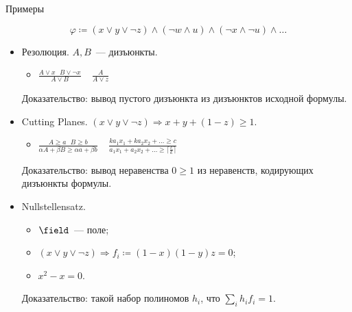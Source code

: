 \begin{frame}{Примеры}

    $$
        \varphi \coloneqq (x \lor y \lor \neg z) \land (\neg w \land u) \land (\neg x \land \neg u) \land \dots
    $$

    \pause
    \begin{itemize}
        \item Резолюция. $A, B$~--- дизъюнкты.
            \begin{itemize}
                \item $\frac{A \lor x ~~~ B \lor \neg x}{A \lor B} ~~~~~ \frac{A}{A \lor z}$
            \end{itemize}
            Доказательство: вывод пустого дизъюнкта из дизъюнктов исходной формулы.
        \pause
        \item Cutting Planes. $(x \lor y \lor \neg z) \Rightarrow x + y + (1 - z) \ge 1$.
            \begin{itemize}
                \item $\frac{A \ge a ~~~ B \ge b}{\alpha A + \beta B \ge \alpha a + \beta b} ~~~~~
                    \frac{ka_1 x_1 + ka_2 x_2 + \dots \ge c}{a_1 x_1 + a_2 x_2 + \dots \ge \lceil
                    \frac{c}{k} \rceil}$
            \end{itemize}
            Доказательство: вывод неравенства $0 \ge 1$ из неравенств, кодирующих дизъюнкты формулы.
        \pause
        \item Nullstellensatz.
            \begin{itemize}
                \item $\field$~--- поле;
                \item $(x \lor y \lor \neg z) \Rightarrow f_i \coloneqq (1 - x) (1 - y) z = 0$;
                \item $x^2 - x = 0$.
            \end{itemize}
            Доказательство: такой набор полиномов $h_i$, что $\sum\limits_{i} h_i f_i = 1$.
    \end{itemize}

\end{frame}